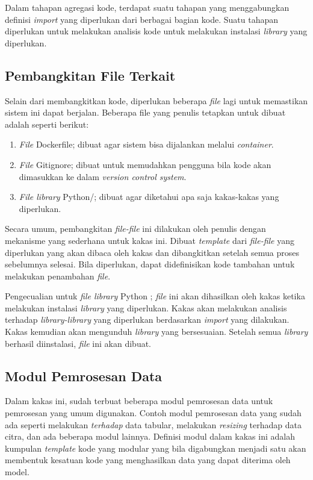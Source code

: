 Dalam tahapan agregasi kode, terdapat suatu tahapan yang menggabungkan definisi \textit{import} yang diperlukan dari berbagai bagian kode.
Suatu tahapan diperlukan untuk melakukan analisis kode untuk melakukan instalasi \textit{library} yang diperlukan.

\subsection{Pembangkitan File Terkait}

Selain dari membangkitkan kode, diperlukan beberapa \textit{file} lagi untuk memastikan sistem ini dapat berjalan.
Beberapa file yang penulis tetapkan untuk dibuat adalah seperti berikut:

\begin{enumerate}
    \item \textit{File} Dockerfile; dibuat agar sistem bisa dijalankan melalui \textit{container}.
    \item \textit{File} Gitignore; dibuat untuk memudahkan pengguna bila kode akan dimasukkan ke dalam \textit{version control system}.
    \item \textit{File library} Python/; dibuat agar diketahui apa saja kakas-kakas yang diperlukan.
\end{enumerate}

Secara umum, pembangkitan \textit{file-file} ini dilakukan oleh penulis dengan mekanisme yang sederhana untuk kakas ini.
Dibuat \textit{template} dari \textit{file-file} yang diperlukan yang akan dibaca oleh kakas dan dibangkitkan setelah semua proses sebelumnya selesai.
Bila diperlukan, dapat didefinisikan kode tambahan untuk melakukan penambahan \textit{file}.

Pengecualian untuk \textit{file library} Python ; \textit{file} ini akan dihasilkan oleh kakas ketika melakukan instalasi \textit{library} yang diperlukan.
Kakas akan melakukan analisis terhadap \textit{library-library} yang diperlukan berdasarkan \textit{import} yang dilakukan.
Kakas kemudian akan mengunduh \textit{library} yang bersesuaian.
Setelah semua \textit{library} berhasil diinstalasi, \textit{file}  ini akan dibuat.

\subsection{Modul Pemrosesan Data}\label{section:04-module}

Dalam kakas ini, sudah terbuat beberapa modul pemrosesan data untuk pemrosesan yang umum digunakan.
Contoh modul pemrosesan data yang sudah ada seperti melakukan \textit{terhadap} data tabular, melakukan \textit{resizing} terhadap data citra, dan ada beberapa modul lainnya.
Definisi modul dalam kakas ini adalah kumpulan \textit{template} kode yang modular yang bila digabungkan menjadi satu akan membentuk kesatuan kode yang menghasilkan data yang dapat diterima oleh model.

